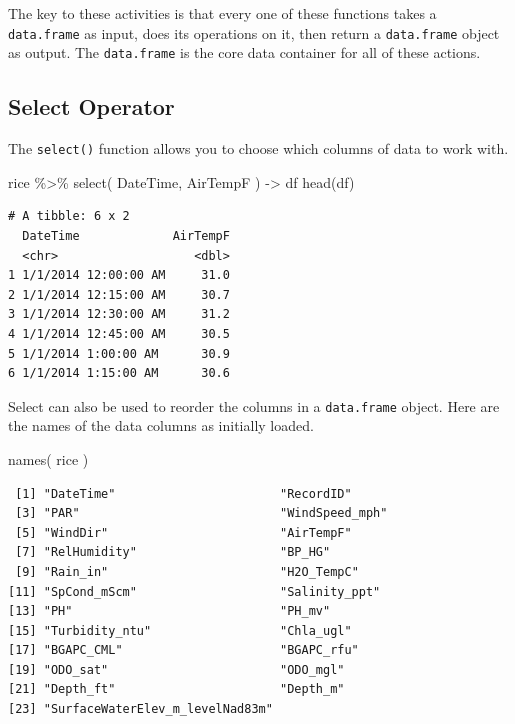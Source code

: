 \documentclass[
  letterpaper,
]{book}
\newenvironment{Shaded}{\begin{snugshade}}{\end{snugshade}}
\newcommand{\FunctionTok}[1]{\textcolor[rgb]{0.28,0.35,0.67}{#1}}
\newcommand{\NormalTok}[1]{\textcolor[rgb]{0.00,0.23,0.31}{#1}}
\newcommand{\OtherTok}[1]{\textcolor[rgb]{0.00,0.23,0.31}{#1}}
\newcommand{\SpecialCharTok}[1]{\textcolor[rgb]{0.37,0.37,0.37}{#1}}
\begin{document}
The key to these activities is that every one of these functions takes a
\texttt{data.frame} as input, does its operations on it, then return a
\texttt{data.frame} object as output. The \texttt{data.frame} is the
core data container for all of these actions.

\subsection{Select Operator}\label{select-operator}

The \texttt{select()} function allows you to choose which columns of
data to work with.

\begin{Shaded}
\begin{Highlighting}[]
\NormalTok{rice }\SpecialCharTok{\%\textgreater{}\%}
  \FunctionTok{select}\NormalTok{( DateTime, AirTempF ) }\OtherTok{{-}\textgreater{}}\NormalTok{ df }
\FunctionTok{head}\NormalTok{(df)}
\end{Highlighting}
\end{Shaded}

\begin{verbatim}
# A tibble: 6 x 2
  DateTime             AirTempF
  <chr>                   <dbl>
1 1/1/2014 12:00:00 AM     31.0
2 1/1/2014 12:15:00 AM     30.7
3 1/1/2014 12:30:00 AM     31.2
4 1/1/2014 12:45:00 AM     30.5
5 1/1/2014 1:00:00 AM      30.9
6 1/1/2014 1:15:00 AM      30.6
\end{verbatim}

Select can also be used to reorder the columns in a \texttt{data.frame}
object. Here are the names of the data columns as initially loaded.

\begin{Shaded}
\begin{Highlighting}[]
\FunctionTok{names}\NormalTok{( rice )}
\end{Highlighting}
\end{Shaded}

\begin{verbatim}
 [1] "DateTime"                       "RecordID"                      
 [3] "PAR"                            "WindSpeed_mph"                 
 [5] "WindDir"                        "AirTempF"                      
 [7] "RelHumidity"                    "BP_HG"                         
 [9] "Rain_in"                        "H2O_TempC"                     
[11] "SpCond_mScm"                    "Salinity_ppt"                  
[13] "PH"                             "PH_mv"                         
[15] "Turbidity_ntu"                  "Chla_ugl"                      
[17] "BGAPC_CML"                      "BGAPC_rfu"                     
[19] "ODO_sat"                        "ODO_mgl"                       
[21] "Depth_ft"                       "Depth_m"                       
[23] "SurfaceWaterElev_m_levelNad83m"
\end{verbatim}
\end{document}

